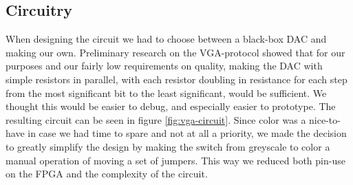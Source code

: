 \subsection{Circuitry}
 When designing the circuit we had to choose between
a black-box \ac{DAC} and making our
own. Preliminary research on the \ac{VGA}-protocol showed that for our purposes
and our fairly low requirements on quality, making the \ac{DAC} with simple
resistors in parallel, with each resistor doubling in resistance for each step
from the most significant bit to the least significant, would be sufficient. We
thought this would be easier to debug, and especially easier to prototype. The
resulting circuit can be seen in figure \ref{fig:vga-circuit}. Since color was a
nice-to-have in case we had time to spare and not at all a priority, we made the
decision to greatly simplify the design by making the switch from greyscale to
color a manual operation of moving a set of jumpers. This way we reduced both
pin-use on the \ac{FPGA} and the complexity of the circuit.
